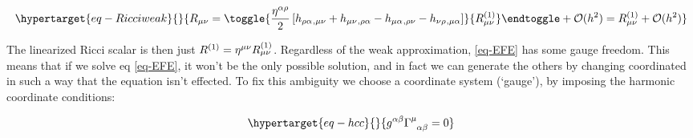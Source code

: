 \documentclass[
  letterpaper,
  DIV=11,
  numbers=noendperiod,
  oneside]{scrreprt}
\begin{document}
\begin{equation}\protect\hypertarget{eq-Ricciweak}{}{ 
\texttip{\texttip{R}{Ricci tensor}_{{\mu\nu}}}{covariant Ricci tensor component}=
\toggle{ \frac{\texttip{\texttip{\eta}{Minkoski metric tensor +---}^{\alpha\rho}}{contravariant Minkoski metric components +---}}{2}\left[ \texttip{\texttip{h}{weak metric tensor}_{\rho\alpha}}{weak covariant metric tensor component}\texttip{{}_{,\mu\nu}}{Partial derivative} + \texttip{\texttip{h}{weak metric tensor}_{{\mu\nu}}}{weak covariant metric tensor component}\texttip{{}_{,\rho\alpha}}{Partial derivative} - \texttip{\texttip{h}{weak metric tensor}_{\mu\alpha}}{weak covariant metric tensor component}\texttip{{}_{,\rho\nu}}{Partial derivative} - \texttip{\texttip{h}{weak metric tensor}_{\nu\rho}}{weak covariant metric tensor component}\texttip{{}_{,\mu\alpha}}{Partial derivative} \right]}{\texttip{\texttip{R^{(1)}}{linearized Ricci tensor}_{{\mu\nu}}}{covariant linearized Ricci tensor component}}\endtoggle + \mathcal{O}(h^2)=\texttip{\texttip{R^{(1)}}{linearized Ricci tensor}_{{\mu\nu}}}{covariant linearized Ricci tensor component}+ \mathcal{O}(h^2)
}\label{eq-Ricciweak}\end{equation}

The linearized Ricci scalar is then just
\(\texttip{R^{(1)}}{linearized Ricci scalar}=\texttip{\texttip{\eta}{Minkoski metric tensor +---}^{{\mu\nu}}}{contravariant Minkoski metric components +---}\texttip{\texttip{R^{(1)}}{linearized Ricci tensor}_{{\mu\nu}}}{covariant linearized Ricci tensor component}\).
Regardless of the weak approximation, \ref{eq-EFE} has some gauge
freedom. This means that if we solve eq \ref{eq-EFE}, it won't be the
only possible solution, and in fact we can generate the others by
changing coordinated in such a way that the equation isn't effected. To
fix this ambiguity we choose a coordinate system (`gauge'), by imposing
the harmonic coordinate conditions:

\begin{equation}\protect\hypertarget{eq-hcc}{}{ 
   \texttip{\texttip{g}{metric tensor}^{\alpha\beta}}{contravariant metric tensor component}\mathtip{\Gamma^{\mu}_{\phantom{\mu}\alpha\beta}}{\text{Levi-Civita Connection: }\Gamma^{\mu}_{\phantom{\mu}\alpha\beta}=
\frac{1}{2} \texttip{\texttip{g}{metric tensor}^{\mu \rho}}{contravariant metric tensor component}
\Big[
    \texttip{\texttip{g}{metric tensor}_{\rho \mu}}{covariant metric tensor component}\texttip{{}_{,\alpha}}{Partial derivative}
    +\texttip{\texttip{g}{metric tensor}_{\rho \alpha}}{covariant metric tensor component}\texttip{{}_{,\mu}}{Partial derivative}
    -\texttip{\texttip{g}{metric tensor}_{\alpha \mu}}{covariant metric tensor component}\texttip{{}_{,\rho}}{Partial derivative} \Big]
} =0
}\label{eq-hcc}\end{equation}
\end{document}
